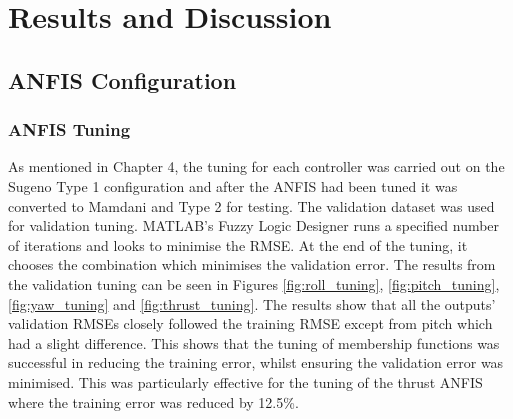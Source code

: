 \chapter{Results and Discussion}\label{chapter5}
\section{ANFIS Configuration}
\subsection{ANFIS Tuning}
As mentioned in Chapter 4, the tuning for each controller was carried out on the Sugeno Type 1 configuration and after the ANFIS had been tuned it was converted to Mamdani and Type 2 for testing. The validation dataset was used for validation tuning. MATLAB’s Fuzzy Logic Designer runs a specified number of iterations and looks to minimise the RMSE. At the end of the tuning, it chooses the combination which minimises the validation error. The results from the validation tuning can be seen in Figures \ref{fig:roll_tuning}, \ref{fig:pitch_tuning}, \ref{fig:yaw_tuning} and \ref{fig:thrust_tuning}. The results show that all the outputs' validation RMSEs closely followed the training RMSE except from pitch which had a slight difference. This shows that the tuning of membership functions was successful in reducing the training error, whilst ensuring the validation error was minimised. This was particularly effective for the tuning of the thrust ANFIS where the training error was reduced by 12.5\%. 
